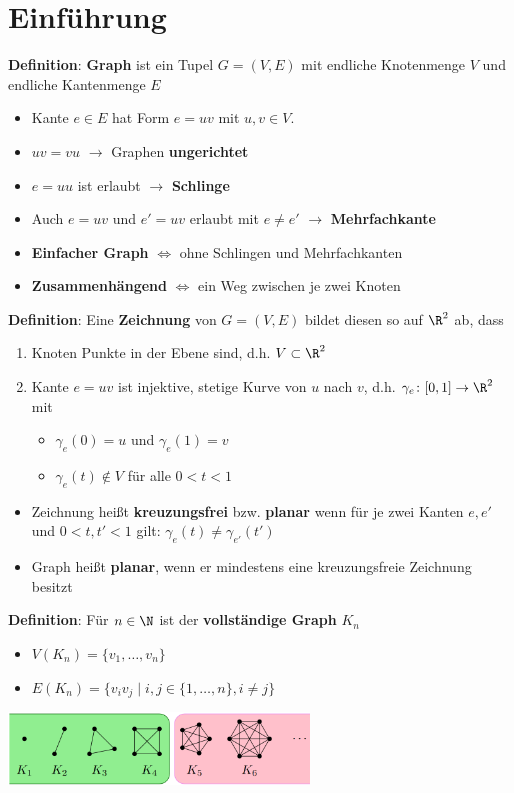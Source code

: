 \section{Einführung}

\textbf{Definition}: \textbf{Graph} ist ein Tupel $G=(V,E)$ mit endliche Knotenmenge $V$ und endliche Kantenmenge $E$
\begin{itemize}
	\item Kante $e \in E$ hat Form $e = uv$ mit $u,v \in V$.
	\item $uv = vu$ $\rightarrow$ Graphen \textbf{ungerichtet}
	\item $e = uu$ ist erlaubt $\rightarrow$ \textbf{Schlinge}
	\item Auch $e = uv$ und $e' = uv$ erlaubt mit $e \neq e'$ $\rightarrow$ \textbf{Mehrfachkante}
	\item \textbf{Einfacher Graph} $\iff$ ohne Schlingen und Mehrfachkanten
	\item \textbf{Zusammenhängend} $\iff$ ein Weg zwischen je zwei Knoten
\end{itemize}
\bigskip
\textbf{Definition}: Eine \textbf{Zeichnung} von $G = (V,E)$ bildet diesen so auf $\R^2$ ab, dass
\begin{enumerate}
	\item Knoten Punkte in der Ebene sind, d.h. $V \subset \R^2$
	\item Kante $e = uv$ ist injektive, stetige Kurve von $u$ nach $v$, d.h. $\gamma_e\colon [0,1] \rightarrow \R^2$ mit 
	\begin{itemize}
		\item $\gamma_e(0) = u$ und $\gamma_e(1) = v$
		\item $\gamma_e(t) \notin V$ für alle $0<t<1$
	\end{itemize}
\end{enumerate}
\medskip
\begin{itemize}
	\item Zeichnung heißt \textbf{kreuzungsfrei} bzw. \textbf{planar} wenn für je zwei Kanten $e, e'$ und $0 < t, t' < 1$ gilt: $\gamma_e(t)\neq\gamma_{e'}(t')$
	\item Graph heißt \textbf{planar}, wenn er mindestens eine kreuzungsfreie Zeichnung besitzt
\end{itemize}
\bigskip
\textbf{Definition}: Für $n\in\N$ ist der \textbf{vollständige Graph} $K_n$
\begin{itemize}
	\item $V(K_n)=\{v_1,\ldots,v_n\}$
	\item $E(K_n)=\{v_iv_j\mid i,j\in \{1,\ldots,n\}, i\neq j\}$
\end{itemize}
\begin{center}
	\includegraphics[width=0.6\textwidth]{images/k.png}
\end{center}

